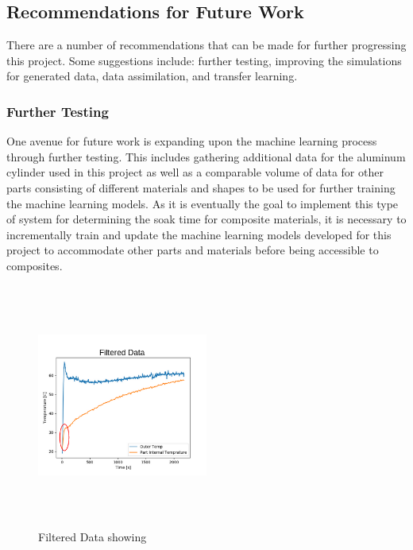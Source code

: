 \subsection{Recommendations for Future Work}
There are a number of recommendations that can be made for further progressing this project. Some suggestions include: further testing, improving the simulations for generated data, data assimilation, and transfer learning. 
\subsubsection{Further Testing}
One avenue for future work is expanding upon the machine learning process through further testing. This includes gathering additional data for the aluminum cylinder used in this project as well as a comparable volume of data for other parts consisting of different materials and shapes to be used for further training the machine learning models. As it is eventually the goal to implement this type of system for determining the soak time for composite materials, it is necessary to incrementally train and update the machine learning models developed for this project to accommodate other parts and materials before being accessible to composites. \newline
\begin{figure}
  \vspace{-50pt}
  \begin{center}
    \includegraphics[width=0.50\textwidth, height = 80mm]{other/filt_data_circle.png}
  \end{center}
  \vspace{-20pt}
  \caption{Filtered Data showing }
  \label{fig:filtered_data_circle}
  \vspace{-20pt}
\end{figure}
